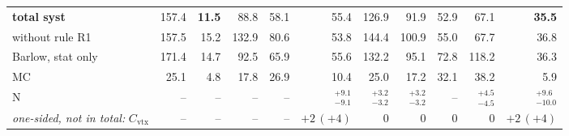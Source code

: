 \begin{tabular}{lrrrrrrrrrr}
\midrule
\textbf{total syst} & 157.4 & \textbf{11.5} & 88.8 & 58.1 & 55.4 & 126.9 & 91.9 & 52.9 & 67.1 & \textbf{35.5} \\
\quad without rule R1 & 157.5 & 15.2 & 132.9 & 80.6 & 53.8 & 144.4 & 100.9 & 55.0 & 67.7 & 36.8 \\
\quad Barlow, stat only & 171.4 & 14.7 & 92.5 & 65.9 & 55.6 & 132.2 & 95.1 & 72.8 & 118.2 & 36.3 \\
MC & 25.1 & 4.8 & 17.8 & 26.9 & 10.4 & 25.0 & 17.2 & 32.1 & 38.2 & 5.9 \\
N & -- & -- & -- & -- & $^{+9.1}_{-9.1}$ & $^{+3.2}_{-3.2}$ & $^{+3.2}_{-3.2}$ & -- & $^{+4.5}_{-4.5}$ & $^{+9.6}_{-10.0}$ \\
\midrule
\textit{one-sided, not in total:} $C_{\mathrm{vtx}}$ & -- & -- & -- & -- & $+2\,(+4)$ & 0 & 0 & 0 & 0 & $+2\,(+4)$ \\
\bottomrule
\end{tabular}
